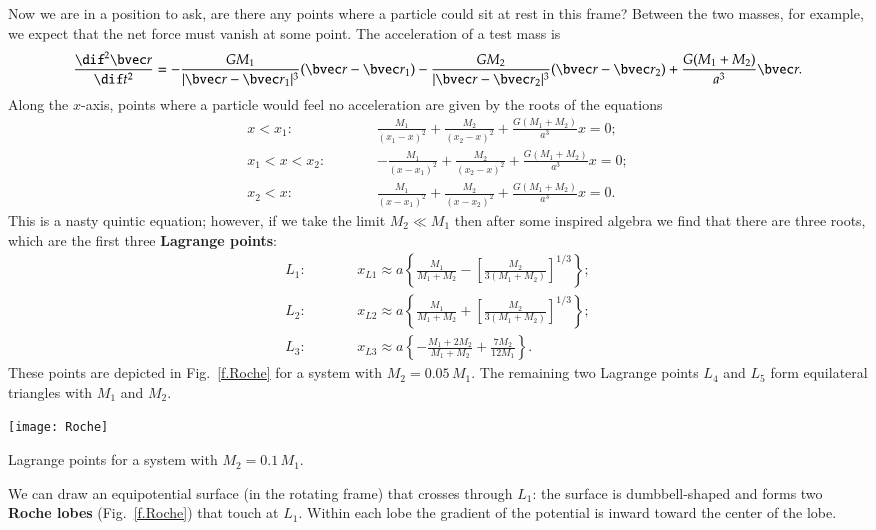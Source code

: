 Now we are in a position to ask, are there any points where a particle could sit at rest in this frame?
Between the two masses, for example, we expect that the net force must vanish at some point. The acceleration of a test mass is 
\begin{equation}\label{e.test-mass-acceleration-x}
\DDtt{\rv} = -\frac{GM_{1}}{|\rv-\rv_{1}|^{3}}(\rv-\rv_{1}) - \frac{GM_{2}}{|\rv-\rv_{2}|^{3}}(\rv-\rv_{2}) + \frac{G(M_{1}+M_{2})}{a^{3}} \rv.
\end{equation}
Along the $x$-axis, points where a particle would feel no acceleration are given by the roots of the equations
\begin{eqnarray*}
	x < x_{1}:&\qquad& \frac{M_{1}}{(x_{1}-x)^{2}} + \frac{M_{2}}{(x_{2}-x)^{2}} + \frac{G(M_{1}+M_{2})}{a^{3}} x = 0;\\
	x_{1} < x < x_{2}:&\qquad& -\frac{M_{1}}{(x-x_{1})^{2}} + \frac{M_{2}}{(x_{2}-x)^{2}} + \frac{G(M_{1}+M_{2})}{a^{3}} x = 0;\\
	x_{2} < x:&\qquad& \frac{M_{1}}{(x-x_{1})^{2}} + \frac{M_{2}}{(x-x_{2})^{2}} + \frac{G(M_{1}+M_{2})}{a^{3}} x = 0.
\end{eqnarray*}
This is a nasty quintic equation; however, if we take the limit $M_{2}\ll M_{1}$ then after some inspired algebra we find that there are three roots, which are the first three \textbf{Lagrange points}:
\begin{eqnarray*}
L_{1}: &\qquad& x_{L1} \approx a\left\{\frac{M_{1}}{M_{1}+M_{2}} - \left[\frac{M_{2}}{3(M_{1}+M_{2})}\right]^{1/3}\right\};\\
L_{2}: &\qquad& x_{L2} \approx a\left\{\frac{M_{1}}{M_{1}+M_{2}} + \left[\frac{M_{2}}{3(M_{1}+M_{2})}\right]^{1/3}\right\};\\
L_{3}: &\qquad& x_{L3} \approx a\left\{-\frac{M_{1}+2M_{2}}{M_{1}+M_{2}} + \frac{7M_{2}}{12M_{1}}\right\}.
\end{eqnarray*}
These points are depicted in Fig.~\ref{f.Roche} for a system with $M_{2} = 0.05\,M_{1}$.
The remaining two Lagrange points $L_{4}$ and $L_{5}$ form equilateral triangles with $M_{1}$ and $M_{2}$.
\begin{marginfigure}
\texttt{[image: Roche]}
\caption{Lagrange points for a system with $M_{2} = 0.1\,M_{1}$.
\label{f.Roche}}
\end{marginfigure}
We can draw an equipotential surface (in the rotating frame) that crosses through $L_{1}$: the surface is dumbbell-shaped and forms two \textbf{Roche lobes} (Fig.~\ref{f.Roche}) that touch at $L_{1}$.  Within each lobe the gradient of the potential is inward toward the center of the lobe.

